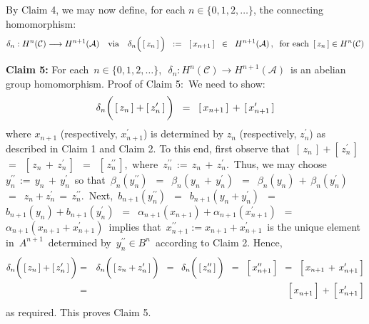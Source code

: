 \vskip 0.5cm
\noindent
By Claim 4, we may now define, for each $n \in \{0,1,2,\ldots\}$, the connecting homomorphism:
\begin{equation*}
\delta_{n} : H^{n}(\mathcal{C}) \longrightarrow H^{n+1}(\mathcal{A})
\quad\textnormal{via}\quad
\delta_{n}\!\left(\,[\,\overset{{\color{white}-}}{z_{n}}\,]\,\right)
\;\; := \;\;
	[\,x_{n+1}\,]
\;\; \in \;\;
	H^{n+1}(\mathcal{A})\,,
\;\;
\textnormal{for each \,$[\,z_{n}\,] \in H^{n}(\mathcal{C})$}
\end{equation*}

\vskip 0.5cm
\noindent
\textbf{Claim 5:}\;\;
For each \,$n \in \{0, 1, 2, \ldots\}$,\,
\,$\delta_{n} : H^{n}(\mathcal{C}) \longrightarrow H^{n+1}(\mathcal{A})$\,
is an abelian group homomorphism.
\vskip 0.2cm
\noindent
Proof of Claim 5:\,
We need to show:
\begin{equation*}
\delta_{n}\!\left(\,[\,z_{n}\,] \overset{{\color{white}-}}{+} [\,z_{n}^{\prime}\,]\,\right)
\;\; = \;\;
	[\,x_{n+1}\,] \,+\, [\,x_{n+1}^{\prime}\,]
\end{equation*}
where $x_{n+1}$ (respectively, $x_{n+1}^{\prime}$) is determined
by $z_{n}$ (respectively, $z_{n}^{\prime}$) as described in Claim 1 and Claim 2.
To this end, first observe that
\,$[\,z_{n}\,] + [\,z_{n}^{\prime}\,]$\,
$=$
\,$[\,z_{n} \,+\, z_{n}^{\prime}\,]$\,
$=$
\,$[\,z_{n}^{\prime\prime}\,]$,\,
where
\,$z_{n}^{\prime\prime} \,:=\, z_{n} \,+\, z_{n}^{\prime}$.\,
Thus, we may choose
\,$y_{n}^{\prime\prime} \,:=\, y_{n} \,+\, y_{n}^{\prime}$\,
so that
\,$\beta_{n}(y_{n}^{\prime\prime})$
\,$=$\, $\beta_{n}(y_{n} \,+\, y_{n}^{\prime})$
\,$=$\, $\beta_{n}(y_{n}) \,+\, \beta_{n}(y_{n}^{\prime})$
\,$=$\, $z_{n} + z_{n}^{\prime} \,=\, z_{n}^{\prime\prime}$.\,
Next,
\,$b_{n+1}(y_{n}^{\prime\prime})$
\,$=$\, $b_{n+1}(y_{n} + y_{n}^{\prime})$
\,$=$\, $b_{n+1}(y_{n}) + b_{n+1}(y_{n}^{\prime})$
\,$=$\, $\alpha_{n+1}(x_{n+1}) + \alpha_{n+1}(x_{n+1}^{\prime})$
\,$=$\, $\alpha_{n+1}(x_{n+1} + x_{n+1}^{\prime})$\,
implies that
\,$x_{n+1}^{\prime\prime} := x_{n+1} + x_{n+1}^{\prime}$\,
is the unique element in \,$A^{n+1}$\, determined by \,$y_{n}^{\prime\prime} \in B^{n}$\,
according to Claim 2.
Hence,
\begin{eqnarray*}
\delta_{n}\!\left(\,[\,z_{n}\,] \overset{{\color{white}-}}{+} [\,z_{n}^{\prime}\,]\,\right)
& = &
	\delta_{n}\!\left(\,[\,z_{n} \overset{{\color{white}-}}{+} z_{n}^{\prime}\,]\,\right)
\;\; = \;\;
	\delta_{n}\!\left(\,[\,\overset{{\color{white}-}}{z_{n}^{\prime\prime}}\,]\,\right)
\;\; = \;\;
	\left[\,\overset{{\color{white}.}}{x_{n+1}^{\prime\prime}}\,\right]
\;\; = \;\;
	\left[\,x_{n+1} \,+\, \overset{{\color{white}.}}{x_{n+1}^{\prime}}\,\right]
\\
& = &
	\left[\,\overset{{\color{white}.}}{x_{n+1}^{{\color{white}\prime}}}\,\right]
	\, + \,
	\left[\,\overset{{\color{white}.}}{x_{n+1}^{\prime}}\,\right]
\end{eqnarray*}
as required.
This proves Claim 5.

